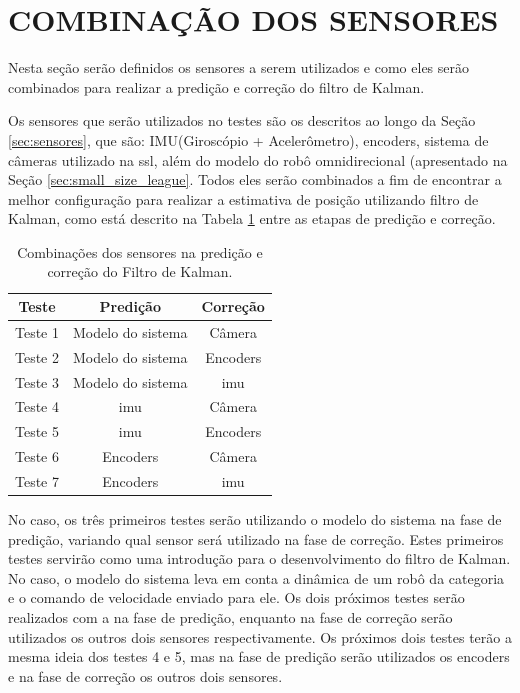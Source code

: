 \documentclass[acronym, symbols, table]{fei}
\begin{document}
	\section{COMBINAÇÃO DOS SENSORES}\label{sec_metodologia_comb_sensores}
	
		Nesta seção serão definidos os sensores a serem utilizados e como eles serão combinados para realizar a predição e correção do filtro de Kalman.
		
		Os sensores que serão utilizados no testes são os descritos ao longo da Seção \ref{sec:sensores}, que são: IMU(Giroscópio + Acelerômetro), encoders, sistema de câmeras utilizado na \acrshort{ssl}, além do modelo do robô omnidirecional (apresentado na Seção \ref{sec:small_size_league}. Todos eles serão combinados a fim de encontrar a melhor configuração para realizar a estimativa de posição utilizando filtro de Kalman, como está descrito na Tabela \ref{tbl:combinacao_sensores} entre as etapas de predição e correção.
		
		\begin{table}[!htb]
			\centering
			\caption{Combinações dos sensores na predição e correção do Filtro de Kalman.}
			\label{tbl:combinacao_sensores}
			\begin{tabular}{|c|c|c|}
				\hline
				\textbf{Teste}   & \textbf{Predição}   & \textbf{Correção} \\ \hline
				Teste 1 & Modelo do sistema & Câmera   \\ \hline
				Teste 2 & Modelo do sistema & Encoders \\ \hline
				Teste 3 & Modelo do sistema & \acrshort{imu} \\ \hline
				Teste 4 & \acrshort{imu}    & Câmera   \\ \hline
				Teste 5 & \acrshort{imu}    & Encoders \\ \hline
				Teste 6 & Encoders          & Câmera   \\ \hline
				Teste 7 & Encoders          & \acrshort{imu} \\ \hline
			\end{tabular}
		\end{table}
		
		No caso, os três primeiros testes serão utilizando o modelo do sistema na fase de predição, variando qual sensor será utilizado na fase de correção. Estes primeiros testes servirão como uma introdução para o desenvolvimento do filtro de Kalman. No caso, o modelo do sistema leva em conta a dinâmica de um robô da categoria  e o comando de velocidade enviado para ele. Os dois próximos testes serão realizados com a  na fase de predição, enquanto na fase de correção serão utilizados os outros dois sensores respectivamente. Os próximos dois testes terão a mesma ideia dos testes 4 e 5, mas na fase de predição serão utilizados os encoders e na fase de correção os outros dois sensores.
		
\end{document}
